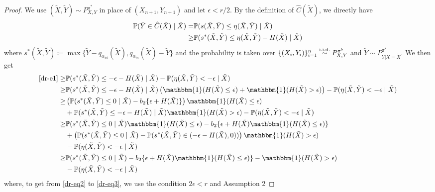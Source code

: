 \begin{proof}


We use $(\tilde{X}, \tilde{Y}) \sim P^{\pi^*}_{X,Y}$ in place of $(X_{n+1}, Y_{n+1})$ and let $\epsilon < r/2$. By the definition of $\hat{C}(\tilde{X})$, we directly have
\begin{align}
    \mathbb{P}(\tilde{Y} \in \hat{C}(\tilde{X}) \mid \tilde{X}) =& \mathbb{P}(s(\tilde{X}, \tilde{Y}) \leq \eta(\tilde{X}, \tilde{Y}) \mid \tilde{X}) \nonumber \\
    \geq& \mathbb{P}(s^*(\tilde{X}, \tilde{Y}) \leq \eta(\tilde{X}, \tilde{Y}) - H(\tilde{X}) \mid \tilde{X}) \label{dr-e1}
\end{align}
where $ s^*(\tilde{X}, \tilde{Y}) \coloneqq \max \{\tilde{Y} - q_{\alpha_{hi}}(\tilde{X}), q_{\alpha_{lo}}(\tilde{X}) - \tilde{Y} \}$ and the probability is taken over $\{(X_i, Y_i)\}_{i=1}^n\overset{\textup{i.i.d.}}{\sim} P^{\pi^b}_{X, Y}$ and $\tilde{Y} \sim P^{\pi^*}_{Y|X=\tilde{X}}$. We then get 
\begin{align}
    \eqref{dr-e1} \geq& \p(s^*(\tilde{X}, \tilde{Y}) \leq -\epsilon - H(\tilde{X}) \mid \tilde{X}) - \p(\eta(\tilde{X}, \tilde{Y}) < -\epsilon \mid \tilde{X}) \nonumber \\
    \geq& \p(s^*(\tilde{X}, \tilde{Y}) \leq -\epsilon - H(\tilde{X}) \mid \tilde{X}) \left(\mathbbm{1}(H(\tilde{X}) \leq \epsilon) + \mathbbm{1}(H(\tilde{X}) > \epsilon)\right) - \p(\eta(\tilde{X}, \tilde{Y}) < -\epsilon \mid \tilde{X}) \label{dr-eq2} \\
    \geq& \left(\p(s^*(\tilde{X}, \tilde{Y}) \leq 0 \mid \tilde{X}) - b_2 \{ \epsilon + H(\tilde{X})\}\right)\mathbbm{1}(H(\tilde{X}) \leq \epsilon)\nonumber \\ 
    & + \p(s^*(\tilde{X}, \tilde{Y}) \leq -\epsilon - H(\tilde{X}) \mid \tilde{X})\mathbbm{1}(H(\tilde{X}) > \epsilon) - \p(\eta(\tilde{X}, \tilde{Y}) < -\epsilon \mid \tilde{X})   \label{dr-eq3} \\
    \geq& \p(s^*(\tilde{X}, \tilde{Y}) \leq 0 \mid \tilde{X})\mathbbm{1}(H(\tilde{X}) \leq \epsilon) - b_2 \{ \epsilon + H(\tilde{X})\mathbbm{1}(H(\tilde{X}) \leq \epsilon)\} \nonumber \\ 
    &+ \left(\p(s^*(\tilde{X}, \tilde{Y}) \leq 0 \mid \tilde{X}) - \p(s^*(\tilde{X}, \tilde{Y}) \in (-\epsilon - H(\tilde{X}), 0))\right)\mathbbm{1}(H(\tilde{X}) > \epsilon) \nonumber\\
    &- \p(\eta(\tilde{X}, \tilde{Y}) < -\epsilon \mid \tilde{X})\nonumber\\
    \geq& \p(s^*(\tilde{X}, \tilde{Y})\leq 0 \mid \tilde{X} ) - b_2 \{ \epsilon + H(\tilde{X}) \mathbbm{1}(H(\tilde{X}) \leq \epsilon ) \} - \mathbbm{1}(H(\tilde{X}) > \epsilon)\nonumber\\
    &- \p(\eta(\tilde{X}, \tilde{Y}) < -\epsilon \mid \tilde{X}) \label{dr-eq4-add}
\end{align}
where, to get from \eqref{dr-eq2} to \eqref{dr-eq3}, we use the condition $2\epsilon < r$ and Assumption 2


\end{proof}
